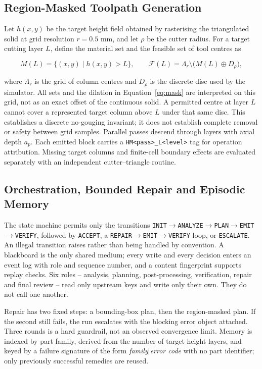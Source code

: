 \subsection{Region-Masked Toolpath Generation}

Let $h(x,y)$ be the target height field obtained by rasterising the triangulated solid at grid resolution $r=0.5$ mm, and let $\rho$ be the cutter radius. For a target cutting layer $L$, define the material set and the feasible set of tool centres as

\begin{equation} \label{eq:mask}
M(L) = \{(x,y) \mid h(x,y) > L\}, \qquad
\mathcal{F}(L) = \Lambda_r \setminus \bigl( M(L) \oplus D_{\rho} \bigr),
\end{equation}

where $\Lambda_r$ is the grid of column centres and $D_{\rho}$ is the discrete disc used by the simulator. All sets and the dilation in Equation~\ref{eq:mask} are interpreted on this grid, not as an exact offset of the continuous solid. A permitted centre at layer $L$ cannot cover a represented target column above $L$ under that same disc. This establishes a discrete no-gouging invariant; it does not establish complete removal or safety between grid samples. Parallel passes descend through layers with axial depth $a_p$. Each emitted block carries a \texttt{HM<pass>\_L<level>} tag for operation attribution. Missing target columns and finite-cell boundary effects are evaluated separately with an independent cutter--triangle routine.

\subsection{Orchestration, Bounded Repair and Episodic Memory}

The state machine permits only the transitions \texttt{INIT}$\to$\texttt{ANALYZE}$\to$\texttt{PLAN}$\to$\texttt{EMIT}$\to$\texttt{VERIFY}, followed by \texttt{ACCEPT}, a \texttt{REPAIR}$\to$\texttt{EMIT}$\to$\texttt{VERIFY} loop, or \texttt{ESCALATE}. An illegal transition raises rather than being handled by convention. A blackboard is the only shared medium; every write and every decision enters an event log with role and sequence number, and a content fingerprint supports replay checks. Six roles -- analysis, planning, post-processing, verification, repair and final review -- read only upstream keys and write only their own. They do not call one another.

Repair has two fixed steps: a bounding-box plan, then the region-masked plan. If the second still fails, the run escalates with the blocking error object attached. Three rounds is a hard guardrail, not an observed convergence limit. Memory is indexed by part family, derived from the number of target height layers, and keyed by a failure signature of the form \emph{family}$|$\emph{error code} with no part identifier; only previously successful remedies are reused.

